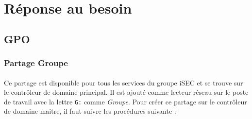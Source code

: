 \section{Réponse au besoin}
	\subsection{GPO}
		\subsubsection{Partage Groupe}
			\paragraph{}
			\label{partage_group}
				Ce partage est disponible pour tous les services du groupe iSEC et se trouve sur le contrôleur de domaine principal. Il est ajouté comme lecteur réseau sur le poste de travail avec la lettre \texttt{G:} comme \textit{Groupe}. Pour créer ce partage sur le contrôleur de domaine maitre, il faut suivre les procédures suivante :

